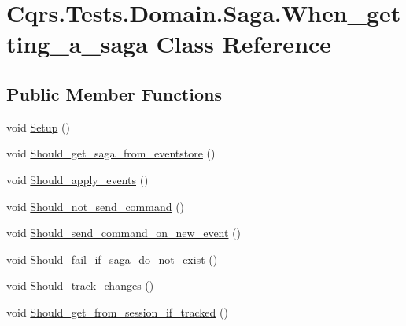 \hypertarget{classCqrs_1_1Tests_1_1Domain_1_1Saga_1_1When__getting__a__saga}{}\section{Cqrs.\+Tests.\+Domain.\+Saga.\+When\+\_\+getting\+\_\+a\+\_\+saga Class Reference}
\label{classCqrs_1_1Tests_1_1Domain_1_1Saga_1_1When__getting__a__saga}
\subsection*{Public Member Functions}
\begin{DoxyCompactItemize}
\item 
void \hyperlink{classCqrs_1_1Tests_1_1Domain_1_1Saga_1_1When__getting__a__saga_ad01cf3fdca0367e26a5529c1158f8b41_ad01cf3fdca0367e26a5529c1158f8b41}{Setup} ()
\item 
void \hyperlink{classCqrs_1_1Tests_1_1Domain_1_1Saga_1_1When__getting__a__saga_a322ca7de7793e731f2d2d39fcae12b1a_a322ca7de7793e731f2d2d39fcae12b1a}{Should\+\_\+get\+\_\+saga\+\_\+from\+\_\+eventstore} ()
\item 
void \hyperlink{classCqrs_1_1Tests_1_1Domain_1_1Saga_1_1When__getting__a__saga_a33c41340c5049e3e9a1be0c3eb3ae8c1_a33c41340c5049e3e9a1be0c3eb3ae8c1}{Should\+\_\+apply\+\_\+events} ()
\item 
void \hyperlink{classCqrs_1_1Tests_1_1Domain_1_1Saga_1_1When__getting__a__saga_ac3706bb8233efa4d428ab3f282c1d61d_ac3706bb8233efa4d428ab3f282c1d61d}{Should\+\_\+not\+\_\+send\+\_\+command} ()
\item 
void \hyperlink{classCqrs_1_1Tests_1_1Domain_1_1Saga_1_1When__getting__a__saga_a2b7a480fc7b5dca8f1bd105bda0d130c_a2b7a480fc7b5dca8f1bd105bda0d130c}{Should\+\_\+send\+\_\+command\+\_\+on\+\_\+new\+\_\+event} ()
\item 
void \hyperlink{classCqrs_1_1Tests_1_1Domain_1_1Saga_1_1When__getting__a__saga_afb09f2b59a54e698723fce8d1171c6c7_afb09f2b59a54e698723fce8d1171c6c7}{Should\+\_\+fail\+\_\+if\+\_\+saga\+\_\+do\+\_\+not\+\_\+exist} ()
\item 
void \hyperlink{classCqrs_1_1Tests_1_1Domain_1_1Saga_1_1When__getting__a__saga_ab99df993d199a3cebe52c546bbb39bf0_ab99df993d199a3cebe52c546bbb39bf0}{Should\+\_\+track\+\_\+changes} ()
\item 
void \hyperlink{classCqrs_1_1Tests_1_1Domain_1_1Saga_1_1When__getting__a__saga_a9be27ce999d88a72caa898836e3670e5_a9be27ce999d88a72caa898836e3670e5}{Should\+\_\+get\+\_\+from\+\_\+session\+\_\+if\+\_\+tracked} ()

\end{DoxyCompactItemize}
